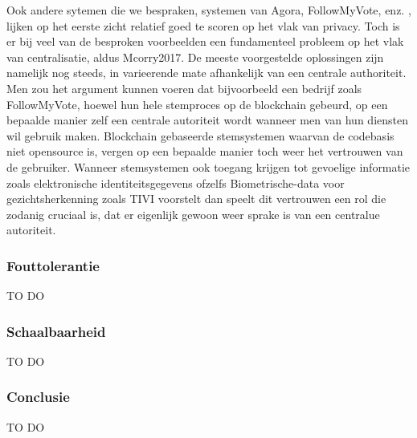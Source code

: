 		Ook  andere sytemen die we bespraken, systemen van Agora, FollowMyVote, enz. , lijken op het eerste zicht  relatief goed te scoren op het vlak van privacy. Toch is er bij veel van de besproken voorbeelden een fundamenteel probleem op het vlak van centralisatie, aldus Mcorry2017. De meeste voorgestelde oplossingen zijn namelijk nog steeds, in varieerende mate afhankelijk van een centrale authoriteit. Men zou het argument kunnen voeren dat bijvoorbeeld een bedrijf zoals FollowMyVote, hoewel hun hele stemproces op de blockchain gebeurd, op een bepaalde manier zelf een centrale autoriteit wordt wanneer men van hun diensten wil gebruik maken. Blockchain gebaseerde stemsystemen waarvan de codebasis  niet opensource is, vergen op een bepaalde manier toch weer het vertrouwen van de gebruiker. Wanneer stemsystemen ook toegang krijgen tot gevoelige informatie zoals elektronische identiteitsgegevens ofzelfs Biometrische-data voor gezichtsherkenning zoals TIVI voorstelt dan speelt dit vertrouwen een rol die zodanig cruciaal is, dat er eigenlijk gewoon weer sprake is van een centralue autoriteit.

		\subsubsection{Fouttolerantie}
		TO DO
		\subsubsection{Schaalbaarheid}
		TO DO
		\subsubsection{Conclusie}
		TO DO
		
		
		
		
	